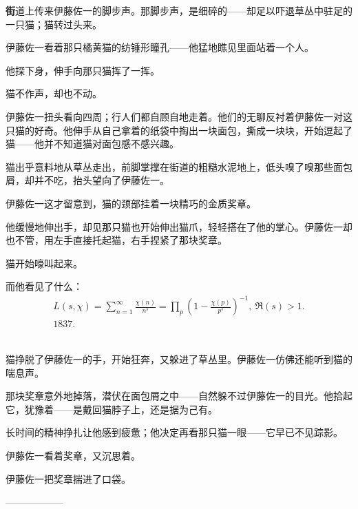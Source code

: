 
\AddSymbolsA
\pagecolor{OliveGreen!30!gray}
\color{white}
\quad\quad \lettrine[,lraise=0.2,lhang=0.5]{\textbf{街}}{道}上传来伊藤佐一的脚步声。那脚步声，是细碎的——却足以吓退草丛中驻足的一只猫；猫转过头来。

伊藤佐一看着那只橘黄猫的纺锤形瞳孔——他猛地瞧见里面站着一个人。

他探下身，伸手向那只猫挥了一挥。

猫不作声，却也不动。

伊藤佐一扭头看向四周；行人们都自顾自地走着。他们的无聊反衬着伊藤佐一对这只猫的好奇。他伸手从自己拿着的纸袋中掏出一块面包，撕成一块块，开始逗起了猫——他并不知道猫对面包感不感兴趣。

猫出乎意料地从草丛走出，前脚掌撑在街道的粗糙水泥地上，低头嗅了嗅那些面包屑，却并不吃，抬头望向了伊藤佐一。

伊藤佐一这才留意到，猫的颈部挂着一块精巧的金质奖章。

他缓慢地伸出手，却见那只猫也开始伸出猫爪，轻轻搭在了他的掌心。伊藤佐一却也不管，用左手直接托起猫，右手捏紧了那块奖章。

猫开始嚎叫起来。

而他看见了什么：
\begin{gather*}
L(s,\chi)=\sum_{n=1}^{\infty}\frac{\chi(n)}{n^s}=\prod_{p}\left(1-\frac{\chi(p)}{p^s}\right)^{-1},\  \Re(s)>1.\\
1837.
\end{gather*}
\ \ \ \ \ 


猫挣脱了伊藤佐一的手，开始狂奔，又躲进了草丛里。伊藤佐一仿佛还能听到猫的喘息声。

那块奖章意外地掉落，潜伏在面包屑之中——自然躲不过伊藤佐一的目光。他拾起它，犹豫着——是戴回猫脖子上，还是据为己有。

长时间的精神挣扎让他感到疲惫；他决定再看那只猫一眼——它早已不见踪影。

伊藤佐一看着奖章，又沉思着。

伊藤佐一把奖章揣进了口袋。

\begin{center}
——————
\end{center}

